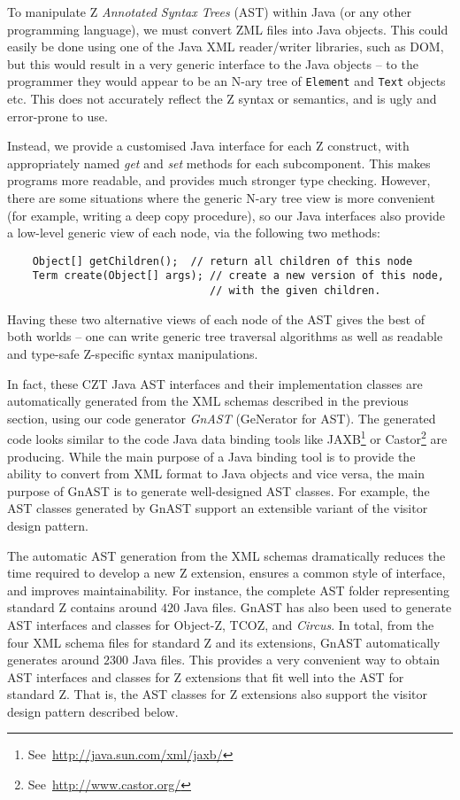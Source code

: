 \documentclass{llncs}
\newcommand{\Circus}{{\sf\slshape Circus}}
\begin{document}
  To manipulate Z \emph{Annotated Syntax Trees} (AST) within Java (or
  any other programming language), we must convert ZML files into Java
  objects.  This could easily be done using one of the Java XML
  reader/writer libraries, such as DOM, but this would result in a
  very generic interface to the Java objects -- to the programmer they
  would appear to be an N-ary tree of \texttt{Element} and
  \texttt{Text} objects etc.  This does not accurately reflect the Z
  syntax or semantics, and is ugly and error-prone to use.

  Instead, we provide a customised Java interface for each Z
  construct, with appropriately named \emph{get} and \emph{set}
  methods for each subcomponent.  This makes programs more readable,
  and provides much stronger type checking.  However, there are some
  situations where the generic N-ary tree view is more convenient
  (for example, writing a deep copy procedure), so our Java interfaces
  also provide a low-level generic view of each node, via the following
  two methods:
\begin{small}
\begin{verbatim}
    Object[] getChildren();  // return all children of this node
    Term create(Object[] args); // create a new version of this node,
                                // with the given children.
\end{verbatim}
\end{small}
  Having these two alternative views of each node of the AST gives
  the best of both worlds -- one can write generic tree traversal 
  algorithms as well as readable and type-safe Z-specific syntax
  manipulations.
  
  In fact, these CZT Java AST interfaces and their implementation
  classes are automatically generated from the XML schemas described
  in the previous section, using our code generator \emph{GnAST}
  (GeNerator for AST).  The generated code looks similar to the code
  Java data binding tools like
  JAXB\footnote{See~\url{http://java.sun.com/xml/jaxb/}} or
  Castor\footnote{See~\url{http://www.castor.org/}} are
  producing. While the main purpose of a Java binding tool is to
  provide the ability to convert from XML format to Java objects and
  vice versa, the main purpose of GnAST is to generate well-designed
  AST classes.  For example, the AST classes generated by GnAST
  support an extensible variant of the visitor design pattern.

  The automatic AST generation from the XML schemas dramatically
  reduces the time required to develop a new Z extension, ensures a
  common style of interface, and improves maintainability.  For
  instance, the complete AST folder representing standard Z contains
  around $420$ Java files.  GnAST has also been used to generate AST
  interfaces and classes for Object-Z, TCOZ, and \Circus.  In total,
  from the four XML schema files for standard Z and its extensions,
  GnAST automatically generates around $2300$ Java files.  This
  provides a very convenient way to obtain AST interfaces and classes
  for Z extensions that fit well into the AST for standard Z.  That
  is, the AST classes for Z extensions also support the visitor design
  pattern described below.
\end{document}
